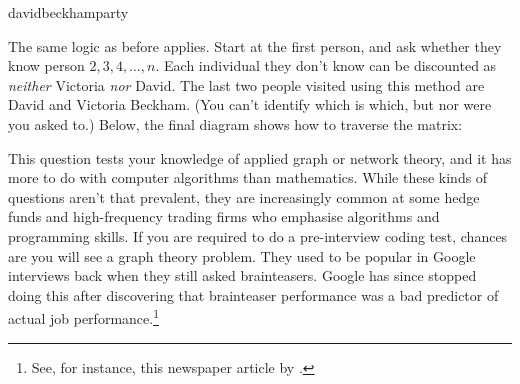 \begin{answer}{davidbeckhamparty}
\begin{center}
\begin{tikzpicture}[scale=0.6]
\end{tikzpicture}
\end{center}
The same logic as before applies.
Start at the first person, and ask whether they know person $2, 3, 4, \ldots, n$.
Each individual they don't know can be discounted as \emph{neither} Victoria \emph{nor} David.
The last two people visited using this method are David and Victoria Beckham.
(You can't identify which is which, but nor were you asked to.)
Below, the final diagram shows how to traverse the matrix:
\begin{center}
\end{center}
This question tests your knowledge of applied graph or network theory, and it has more to do with computer algorithms than mathematics.
While these kinds of questions aren't that prevalent, they are increasingly common at some hedge funds and high-frequency trading firms who emphasise algorithms and programming skills.
If you are required to do a pre-interview coding test, chances are you will see a graph theory problem.
They used to be popular in Google interviews back when they still asked brainteasers.
Google has since stopped doing this after discovering that brainteaser performance was a bad predictor of actual job performance.\footnote{See, for instance, this newspaper article by \citet{GoogleBrainteasers}.}

\end{answer}
